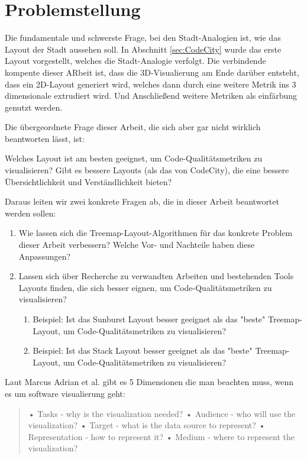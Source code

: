 \section{Problemstellung} \label{sec:Problemstellung}
Die fundamentale und schwerste Frage, bei den Stadt-Analogien ist, wie das Layout der Stadt aussehen soll. In Abschnitt \ref{sec:CodeCity} wurde das erste Layout vorgestellt, welches die Stadt-Analogie verfolgt. Die verbindende kompente dieser ARbeit ist, dass die 3D-Visualierung am Ende darüber entsteht, dass ein 2D-Layout generiert wird, welches dann durch eine weitere Metrik ins 3 dimensionale extrudiert wird. Und Anschließend weitere Metriken als einfärbung genutzt werden.


Die übergeordnete Frage dieser Arbeit, die sich aber gar nicht wirklich beantworten lässt, ist:

Welches Layout ist am besten geeignet, um Code-Qualitätsmetriken zu visualisieren? Gibt es bessere Layouts (als das von CodeCity), die eine bessere Übersichtlichkeit und Verständlichkeit bieten? 

Daraus leiten wir zwei konkrete Fragen ab, die in dieser Arbeit beantwortet werden sollen:
\begin{enumerate}
    \item Wie lassen sich die Treemap-Layout-Algorithmen für das konkrete Problem dieser Arbeit verbessern? Welche Vor- und Nachteile haben diese Anpassungen?
    \item Lassen sich über Recherche zu verwandten Arbeiten und bestehenden Tools Layouts finden, die sich besser eignen, um Code-Qualitätsmetriken zu visualisieren? 
    \begin{enumerate}
        \item Beispiel: Ist das Sunburst Layout besser geeignet als das "beste" Treemap-Layout, um Code-Qualitätsmetriken zu visualisieren?
        \item Beispiel: Ist das Stack Layout besser geeignet als das "beste" Treemap-Layout, um Code-Qualitätsmetriken zu visualisieren?
    \end{enumerate}
\end{enumerate}

Laut Marcus Adrian et al.  gibt es 5 Dimensionen die man beachten muss, wenn es um software visualierung geht: 
\begin{quote}    
    • Tasks - why is the visualization needed?
    • Audience - who will use the visualization?
    • Target - what is the data source to represent?
    • Representation - how to represent it?
    • Medium - where to represent the visualization? \cite[2]{3dsoftwareMarcus}
\end{quote}

